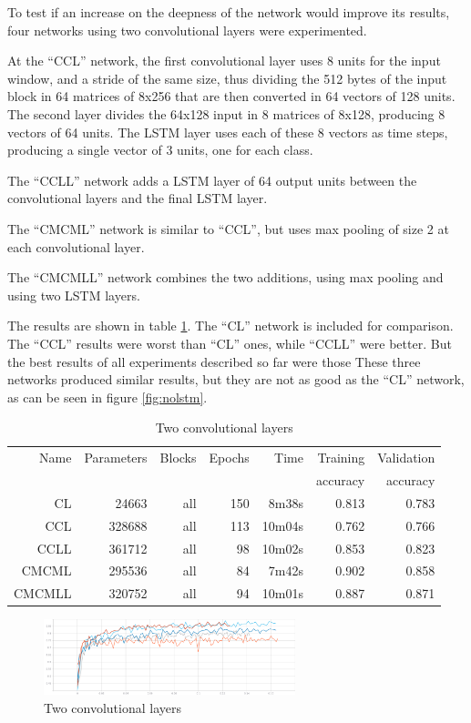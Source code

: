To test if an increase on the deepness of the network would improve its results, four networks using two convolutional layers were experimented. 

At the ``CCL'' network, the first convolutional layer uses 8 units for the input window, and a stride of the same size, thus dividing the 512 bytes of the input block in 64 matrices of 8x256 that are then converted in 64 vectors of 128 units. The second layer divides the 64x128 input in 8 matrices of 8x128, producing 8 vectors of 64 units. The LSTM layer uses each of these 8 vectors as time steps, producing a single vector of 3 units, one for each class.

The ``CCLL'' network adds a LSTM layer of 64 output units between the convolutional layers and the final LSTM layer.

The ``CMCML'' network is similar to ``CCL'', but uses max pooling of size 2 at each convolutional layer.

The ``CMCMLL'' network combines the two additions, using max pooling and using two LSTM layers.

The results are shown in table \ref{tab:carving2convs}. The ``CL'' network is included for comparison. The ``CCL'' results were worst than ``CL'' ones, while ``CCLL'' were better. But the best results of all experiments described so far were those
These three networks produced similar results, but they are not as good as the ``CL'' network, as can be seen in figure
\ref{fig:nolstm}.

\begin{table}[!ht]
    \centering
    \caption{Two convolutional layers}
    \label{tab:carving2convs}
\begin{tabular}{r|r|r|r|r|r|r}
\hline
Name & Parameters & Blocks & Epochs & Time & Training          & Validation          \\       
     &            &        &        &         &          accuracy &            accuracy \\ \hline\hline

CL & 24663  & all & 150 & 8m38s  & 0.813 & 0.783 \\ \hline
CCL    & 328688 & all & 113 & 10m04s & 0.762 & 0.766 \\ \hline
CCLL   & 361712 & all & 98  & 10m02s & 0.853 & 0.823 \\ \hline
CMCML  & 295536 & all & 84  & 7m42s  & 0.902 & 0.858 \\ \hline
CMCMLL & 320752 & all & 94  & 10m01s & 0.887 & 0.871 \\ \hline
\end{tabular}
\end{table}

\begin{figure}[htb!]
\centering\includegraphics[width=0.65\textwidth]{content/twoconvs.png}
\caption{\label{fig:twoconvs}Two convolutional layers}%
\end{figure}
